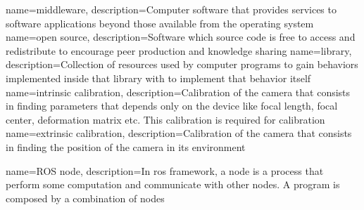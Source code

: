 {
        name=middleware,
        description={Computer software that provides services to software applications beyond those available from the operating system}
}
{
        name=open source,
        description={Software which source code is free to access and redistribute to encourage peer production and knowledge sharing}
}
{
        name=library,
        description={Collection of resources used by computer programs to gain behaviors implemented inside that library with to implement that behavior itself}
}
{
        name=intrinsic calibration,
        description={Calibration of the camera that consists in finding parameters that depends only on the device like focal length, focal center, deformation matrix etc. This calibration is required for  calibration}
}
{
    name=extrinsic calibration,
    description={Calibration of the camera that consists in finding the position of the camera in its environment}
}

{
    name=ROS node,
    description={In \acrshort{ros} framework, a node is a process that perform some computation and communicate with other nodes. A program is composed by a combination of nodes}
}